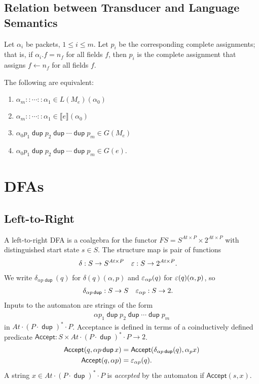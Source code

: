 \documentclass{article}
\newcommand\den[1]{\llbracket #1\rrbracket}
\newcommand\At{\ensuremath{\mathit{At}}}
\newcommand\pdup{\mathop{\mathsf{dup}}}
\renewcommand\star{^{\textstyle *}}
\newcommand\acc{\mathsf{Accept}}
\begin{document}
\subsection*{Relation between Transducer and Language Semantics}

Let $\alpha_i$ be packets, $1\leq i\leq m$. Let $p_i$ be the corresponding complete assignments; that is, if $\alpha_i.f = n_f$ for all fields $f$, then $p_i$ is the complete assignment that assigns $f\leftarrow n_f$ for all fields $f$.

\begin{theorem}
The following are equivalent:
\begin{enumerate}
\romanize
\item
$\alpha_m::\cdots::\alpha_1 \in L(M_e)(\alpha_0)$
\item
$\alpha_m::\cdots::\alpha_1 \in \den{e}(\alpha_0)$
\item
$\alpha_0 p_1 \pdup p_2 \pdup \cdots \pdup p_m \in G(M_e)$
\item
$\alpha_0 p_1 \pdup p_2 \pdup \cdots \pdup p_m \in G(e)$.
\end{enumerate}
\end{theorem}

\section*{DFAs}

\subsection*{Left-to-Right}

A left-to-right DFA is a coalgebra for the functor $FS = S^{\At\times P}\times 2^{\At\times P}$ with distinguished start state $s\in S$. The structure map is pair of functions
\begin{align*}
\delta &: S\to S^{\At\times P} & \eps &: S\to 2^{\At\times P}.
\end{align*}
We write $\delta_{\alpha p\pdup}(q)$ for $\delta(q)(\alpha,p)$ and $\varepsilon_{\alpha p}(q)$ for $\varepsilon(q)(\alpha,p)$, so
\begin{align*}
\delta_{\alpha p\pdup} &: S\to S & \eps_{\alpha p} &: S\to 2.
\end{align*}
Inputs to the automaton are strings of the form
\begin{align*}
\alpha p_1\pdup p_2\pdup\cdots\pdup p_m
\end{align*}
in $\At\cdot(P\cdot\pdup)\star\cdot P$. Acceptance is defined in terms of a coinductively defined predicate $\acc:S\times\At\cdot(P\cdot\pdup)\star\cdot P\to 2$.
\begin{align*}
\acc(q,\alpha p\pdup x) &= \acc(\delta_{\alpha p\pdup}(q),\alpha_p x)\\
\acc(q,\alpha p) &= \eps_{\alpha p}(q).
\end{align*}
A string $x\in\At\cdot(P\cdot\pdup)\star\cdot P$ is \emph{accepted} by the automaton if $\acc(s,x)$.
\end{document}
